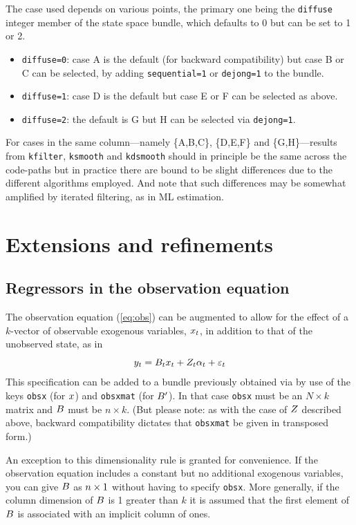 The case used depends on various points, the primary one being the
\texttt{diffuse} integer member of the state space bundle, which
defaults to 0 but can be set to 1 or 2.
\begin{itemize}
\item \texttt{diffuse=0}: case A is the default (for backward
  compatibility) but case B or C can be selected, by adding
  \texttt{sequential=1} or \texttt{dejong=1} to the bundle.
\item \texttt{diffuse=1}: case D is the default but case
  E or F can be selected as above.
\item \texttt{diffuse=2}: the default is G but H can be selected
  via \texttt{dejong=1}.
\end{itemize}

For cases in the same column---namely \{A,B,C\}, \{D,E,F\} and
\{G,H\}---results from \texttt{kfilter}, \texttt{ksmooth} and
\texttt{kdsmooth} should in principle be the same across the code-paths
but in practice there are bound to be slight differences due to the
different algorithms employed. And note that such differences may be
somewhat amplified by iterated filtering, as in ML estimation.

\section{Extensions and refinements}
\label{sec:extensions}

\subsection{Regressors in the observation equation}
\label{sec:obsx}

The observation equation (\ref{eq:obs}) can be augmented to allow for
the effect of a $k$-vector of observable exogenous variables,
$x_t$, in addition to that of the unobserved state, as in
\[
  y_t = B_tx_t + Z_t \alpha_t +
  \varepsilon_t
\]
This specification can be added to a bundle previously obtained via
 by use of the keys \texttt{obsx} (for $x$) and
\texttt{obsxmat} (for $B'$). In that case \texttt{obsx} must be
an $N \times k$ matrix and $B$ must be $n \times k$. (But
please note: as with the case of $Z$ described above, backward
compatibility dictates that \texttt{obsxmat} be given in transposed
form.)

An exception to this dimensionality rule is granted for convenience.
If the observation equation includes a constant but no additional
exogenous variables, you can give $B$ as $n \times 1$
without having to specify \texttt{obsx}.  More generally, if the
column dimension of $B$ is 1 greater than $k$ it is assumed
that the first element of $B$ is associated with an implicit
column of ones.

